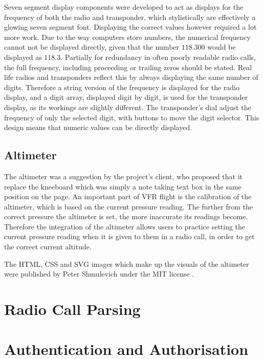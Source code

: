 Seven segment display components were developed to act as displays for the frequency of both the radio and transponder, which stylistically are effectively a glowing seven segment font. Displaying the correct values however required a lot more work. Due to the way computers store numbers, the numerical frequency cannot not be displayed directly, given that the number $118.300$ would be displayed as $118.3$. Partially for redundancy in often poorly readable radio calls, the full frequency, including proceeding or trailing zeros should be stated. Real life radios and transponders reflect this by always displaying the same number of digits. Therefore a string version of the frequency is displayed for the radio display, and a digit array, displayed digit by digit, is used for the transponder display, as its workings are slightly different. The transponder's dial adjust the frequency of only the selected digit, with buttons to move the digit selector. This design means that numeric values can be directly displayed.

\subsection{Altimeter}
\label{sse:altimeter}

The altimeter was a suggestion by the project's client, who proposed that it replace the kneeboard which was simply a note taking text box in the same position on the page. An important part of VFR flight is the calibration of the altimeter, which is based on the current pressure reading. The further from the correct pressure the altimeter is set, the more inaccurate its readings become. Therefore the integration of the altimeter allows users to practice setting the current pressure reading when it is given to them in a radio call, in order to get the correct current altitude.

The HTML, CSS and SVG images which make up the visuals of the altimeter were published by Peter Shmulevich under the MIT license \cite{altimeter-codepen}.

\section{Radio Call Parsing}
\label{se:parsing}

\section{Authentication and Authorisation}
\label{se:authauthor}
